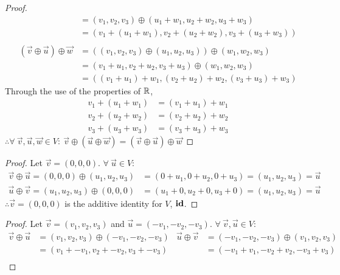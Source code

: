 \documentclass{article}
\begin{document}
\begin{enumerate}
\begin{proof}
\begin{align*}
                                                    & = (v_1,v_2,v_3) \oplus (u_1+w_1,u_2+w_2,u_3+w_3)            \\
                                                    & = (v_1+(u_1+w_1),v_2+(u_2+w_2),v_3+(u_3+w_3))               \\ \\
            (\vec{v} \oplus \vec{u}) \oplus \vec{w} & = ((v_1,v_2,v_3) \oplus (u_1,u_2,u_3)) \oplus (w_1,w_2,w_3) \\
                                                    & = (v_1+u_1,v_2+u_2,v_3+u_3) \oplus (w_1,w_2,w_3)            \\
                                                    & = ((v_1+u_1)+w_1,(v_2+u_2)+w_2,(v_3+u_3)+w_3)
        \end{align*}
        Through the use of the properties of $\mathbb{R}$,
        \begin{align*}
            v_1+(u_1+w_1) & = (v_1+u_1)+w_1 \\
            v_2+(u_2+w_2) & = (v_2+u_2)+w_2 \\
            v_3+(u_3+w_3) & = (v_3+u_3)+w_3
        \end{align*}
        $\therefore \forall~\vec{v},\vec{u},\vec{w} \in V:~\vec{v} \oplus (\vec{u} \oplus \vec{w}) = (\vec{v} \oplus \vec{u}) \oplus \vec{w}$
    \end{proof}
    \begin{proof}
        Let $\vec{v} = (0,0,0)$. $\forall~\vec{u} \in V$:
        \begin{align*}
            \vec{v} \oplus \vec{u} = (0,0,0) \oplus (u_1,u_2,u_3) & = (0+u_1,0+u_2,0+u_3) = (u_1,u_2,u_3) = \vec{u} \\
            \vec{u} \oplus \vec{v} = (u_1,u_2,u_3) \oplus (0,0,0) & = (u_1+0,u_2+0,u_3+0) = (u_1,u_2,u_3) = \vec{u}
        \end{align*}
        $\therefore \vec{v} = (0,0,0)$ is the additive identity for $V$, $\operatorname{\textbf{id}}$.
    \end{proof}
    \begin{proof}
        Let $\vec{v} = (v_1,v_2,v_3)$ and $\vec{u} = (-v_1,-v_2,-v_3)$. $\forall~\vec{v},\vec{u} \in V$:
        \begin{align*}
            \vec{v} \oplus \vec{u} & = (v_1,v_2,v_3) \oplus (-v_1,-v_2,-v_3) & \vec{u} \oplus \vec{v} & = (-v_1,-v_2,-v_3) \oplus (v_1,v_2,v_3) \\
                                   & = (v_1+-v_1,v_2+-v_2,v_3+-v_3)          &                        & = (-v_1+v_1,-v_2+v_2,-v_3+v_3)          \\

\end{align*}
\end{proof}
\end{enumerate}
\end{document}
